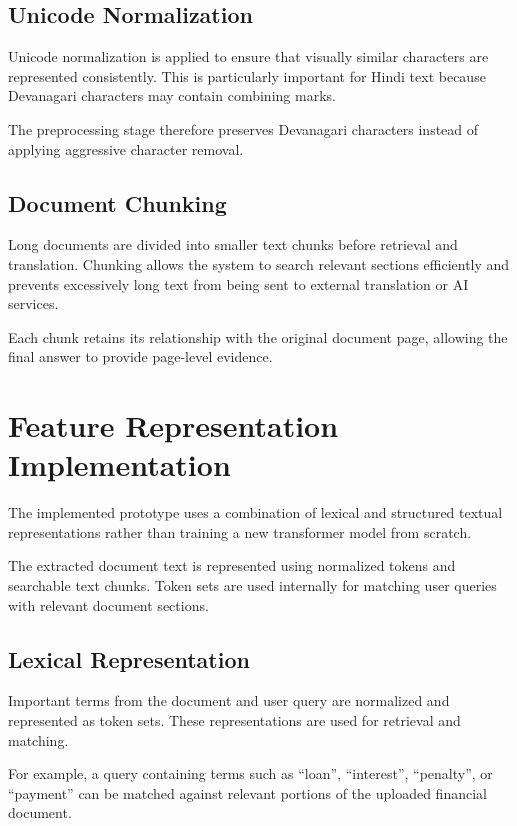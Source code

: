 \subsection{Unicode Normalization}

Unicode normalization is applied to ensure that visually similar
characters are represented consistently. This is particularly
important for Hindi text because Devanagari characters may contain
combining marks.

The preprocessing stage therefore preserves Devanagari characters
instead of applying aggressive character removal.

\subsection{Document Chunking}

Long documents are divided into smaller text chunks before retrieval
and translation. Chunking allows the system to search relevant
sections efficiently and prevents excessively long text from being
sent to external translation or AI services.

Each chunk retains its relationship with the original document page,
allowing the final answer to provide page-level evidence.

\section{Feature Representation Implementation}

The implemented prototype uses a combination of lexical and
structured textual representations rather than training a new
transformer model from scratch.

The extracted document text is represented using normalized tokens
and searchable text chunks. Token sets are used internally for
matching user queries with relevant document sections.

\subsection{Lexical Representation}

Important terms from the document and user query are normalized and
represented as token sets. These representations are used for
retrieval and matching.

For example, a query containing terms such as ``loan'', ``interest'',
``penalty'', or ``payment'' can be matched against relevant portions
of the uploaded financial document.

